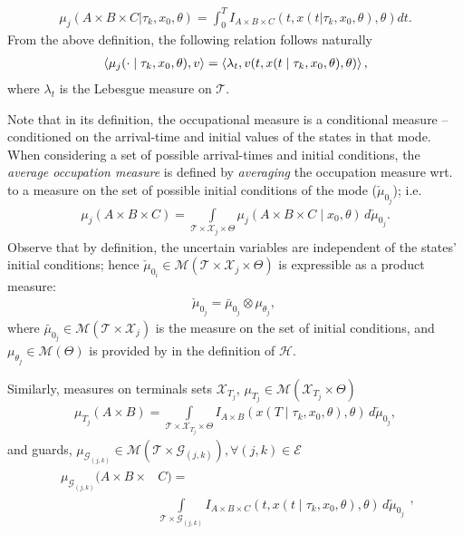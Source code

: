 \small
\begin{align*}
\mu_j(A\times B\times C| \tau_k ,x_0,\theta)=\int_{0}^T I_{A\times B\times C}(t,x(t|\tau_k,x_0,\theta),\theta)dt.
\end{align*}
\normalsize
From the above definition, the following relation follows naturally
\begin{align}
\left\langle \mu_j(\cdot\mid \tau_k,x_0,\theta),v\right\rangle=\left\langle \lambda_t,v(t,x(t\mid \tau_k,x_0,\theta),\theta)\right\rangle,
\label{eq:mu_lambda}
\end{align}
where $\lambda_t$ is the Lebesgue measure on $\mathcal T$.\par
Note that in its definition, the occupational measure is a conditional measure -- conditioned on the arrival-time and initial values of the states in that mode.
When considering a set of possible arrival-times and initial conditions, the {\em average occupation measure} is defined by {\em averaging} the occupation measure wrt. to a measure on the set of possible initial conditions of the mode ($\check\mu_{0_j}$); i.e.
\begin{align}
\mu_j(A\times B\times C)=\int\limits_{\mathcal T\times \mathcal X_j\times \Theta}\mu_j(A\times B\times C\mid x_0,\theta)\,d\check \mu_{0_j}.
\label{eq:mu_avg}
\end{align}
\normalsize
Observe that by definition, the uncertain variables are independent of the states' initial conditions; hence $\check\mu_{0_i}\in \mathcal M(\mathcal T\times\mathcal X_j\times \Theta)$ is expressible as a product measure:
\begin{align}
\check\mu_{0_j}=\bar\mu_{0_j}\otimes \mu_{\theta_j},\
\end{align}
where $\bar \mu_{0_j}\in \mathcal M(\mathcal T\times \mathcal X_j)$ is the measure on the set of initial conditions, and $\mu_{\theta_j}\in \mathcal M(\Theta)$ is provided by in the definition of $\mathcal H$.\par
Similarly, measures on terminals sets $\mathcal X_{T_j}$, $\mu_{T_j}\in \mathcal M(\mathcal X_{T_j}\times \Theta)$
\begin{align*}
\mu_{T_j}(A\times B)=\int\limits_{\mathcal T\times \mathcal X_{T_j}\times \Theta}I_{A\times B}(x(T\mid \tau_k,x_0,\theta),\theta)\,d\check\mu_{0_{j}},
\end{align*}
and guards, $\mu_{\mathcal G_{(j,k)}}\in \mathcal M(\mathcal T\times \mathcal G_{(j,k)}),\forall(j,k)\in \mathcal E$
\begin{align*}
\begin{split}
\mu_{\mathcal G_{(j,k)}}(A\times B\times& C)=\\&\int\limits_{\mathcal T\times \mathcal G_{(j,k)}}I_{A\times B\times C}(t,x(t\mid \tau_k,x_0,\theta),\theta)\,d\check\mu_{0_{j}}
\end{split},
\end{align*}
